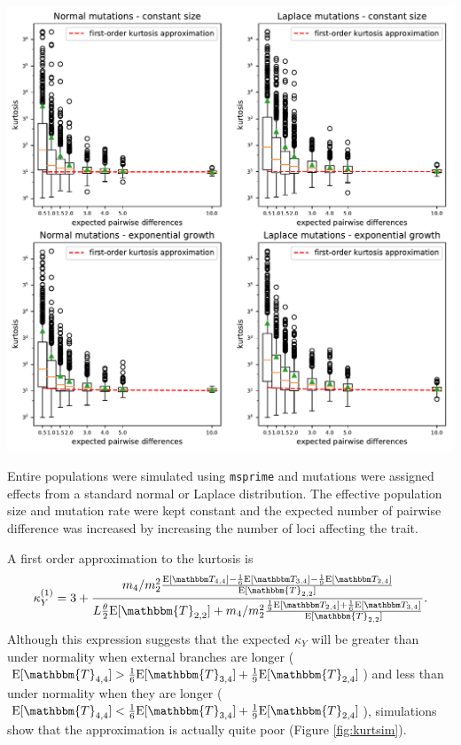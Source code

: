 \begin{center}
  \centering \includegraphics[width=\textwidth]{figures/kurt_sim.pdf}
  \label{fig:kurtsim}
\end{center}
Entire populations were simulated using \texttt{msprime} \citep{Kelleher2015}
and mutations were assigned effects from a standard normal or Laplace
distribution. The effective population size and mutation rate were kept constant
and the expected number of pairwise difference was increased by increasing the
number of loci affecting the trait.

A first order approximation to the kurtosis is
\begin{equation}
    \label{eq:firstord} 
\kappa_Y^{(1)} = 3 + \frac{m_4/m_2^2 \frac{\CCC}{\E[\mathbbm{T}_{2,2}]}} {L \T \E[\mathbbm{T}_{2,2}]
    + m_4/m_2^2 \frac{\BBB}{\E[\mathbbm{T}_{2,2}]}}.
\end{equation}
Although this expression suggests that the expected $\kappa_Y$ will be greater
than under normality when external branches are longer ($\E[\mathbbm{T}_{4,4}] >
\frac{1}{6}\E[\mathbbm{T}_{3,4}] + \frac{1}{9}\E[\mathbbm{T}_{2,4}]$) and less
than under normality when they are longer ($\E[\mathbbm{T}_{4,4}] <
\frac{1}{6}\E[\mathbbm{T}_{3,4}] + \frac{1}{9}\E[\mathbbm{T}_{2,4}]$),
simulations show that the approximation is actually quite poor (Figure
\ref{fig:kurtsim}).
